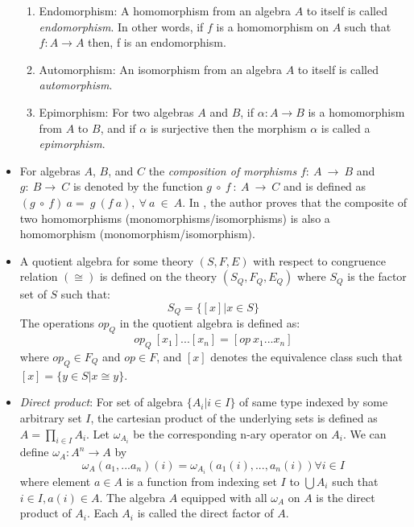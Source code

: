 \begin{itemize}
\begin{enumerate}
        \item Endomorphism: A homomorphism from an algebra $A$ to itself is
        called \textit{endomorphism}. In other words, if $f$ is a homomorphism on $A$
        such that $f:A\rightarrow A$ then, f is an endomorphism.

        \item Automorphism: An isomorphism from an algebra $A$ to itself is
        called \textit{automorphism}.

        \item Epimorphism: For two algebras $A$ and $B$, if \(\alpha : A
        \rightarrow B \) is a homomorphism from $A$ to $B$, and if \(\alpha\) is
        surjective then the morphism \(\alpha\) is called a
        \textit{epimorphism}.
    \end{enumerate}

    \item For algebras $A$, $B$, and $C$ the \textit{composition of morphisms}
    $f:\ A \ \rightarrow \ B$ and $g:\ B \rightarrow\ C$ is denoted by the
    function $g\ \circ \ f\ :\ A\ \rightarrow \ C$ and is defined as $(g\ \circ
    \ f)\ a = \ g\ (f\ a), \ \forall \ a\ \in\ A$. In
    \cite{sankappanavar1981course}, the author proves that the composite of two
    homomorphisms (monomorphisms/isomorphisms) is also a homomorphism
    (monomorphism/isomorphism).

    \item A quotient algebra for some theory $(S,F,E)$ with respect to
    congruence relation $(\cong)$ is defined on the theory $(S_Q,F_Q,E_Q)$ where
    $S_Q$ is the factor set of $S$ such that: \[S_Q = \{[x] | x \in S\}\] The
    operations $op_Q$ in the quotient algebra is defined as: \[op_Q\
    [x_1]...[x_n] = [op\ x_1 ... x_n]\] where $op_Q \in F_Q$ and $op \in F$, and
    $[x]$ denotes the equivalence class such that \([x] = \{y \in S | x \cong
    y\}\).
    
    \item \textit{Direct product}: For set of algebra $\{ A_i | i \in I \}$ of
    same type indexed by some arbitrary set $I$, the cartesian product of the
    underlying sets is defined as $A = \displaystyle \prod_{i\in I} A_i$. Let
    $\omega_{A_i}$ be the corresponding n-ary operator on $A_i$. We can define
    $\omega_A : A^{n} \rightarrow A$ by \[ \omega_A(a_1,...a_n)(i) =
    \omega_{A_i} (a_1(i),...,a_n(i)) \forall i \in I\] where element $a \in A$
    is a function from indexing set $I$ to $\bigcup A_i$ such that $i \in I,
    a(i) \in A$. The algebra $A$ equipped with all $\omega_A$ on $A$ is the
    direct product of $A_i$. Each $A_i$ is called the direct factor of $A$.

\end{itemize}